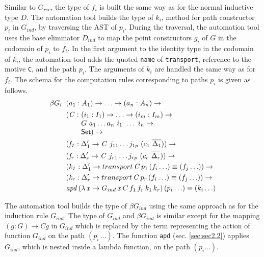\documentclass[sigplan,10pt]{acmart}
\begin{document}
Similar to $G_{rec}$, the type of $f_i$ is built the same way as for the normal inductive type $D$. The automation tool builds the type of $k_i$, method for path constructor $p_i$ in $G_{ind}$, by traversing the AST of $p_i$. During the traversal, the automation tool uses the base eliminator $D_{ind}$ to map the point constructors $g_i$ of $G$ in the codomain of $p_i$ to $f_i$. In the first argument to the identity type in the codomain of $k_i$, the automation tool adds the quoted {\tt name} of {\tt transport}, reference to the motive {\tt C}, and the path $p_i$. The arguments of $k_i$ are handled the same way as for $f_i$. The schema for the computation rules corresponding to paths $p_i$ is given as follows.
\begin{align*}
\beta G_i : & (a_1 : A_1) \to \ldots \to (a_n : A_n) \to\\
& \begin{array}{@{}l@{}l}(\mathit{C} :\ & (i_1 : I_1) \to \ldots \to (i_m : I_m) \to\\  & G\ a_1 \ldots a_n\ i_1\ \ldots\ i_n \to\\ &\SET{})\to\end{array} \\
& (\mathit{f_1} : \Delta_1^\prime \to \mathit{C}\ j_{11} \ldots j_{1p}\ (c_1\ \overline{\Delta_1})) \to \\
& (\mathit{f_r} : \Delta_r^\prime \to \mathit{C}\ j_{r1} \ldots j_{rp}\ (c_r\ \overline{\Delta_r})) \to \\
& (\mathit{k_1} : \Delta_1^\prime \to transport \, \mathit{C} \, p_1 \, (f_i \ldots) \equiv (f_j \ldots)) \to \\
& (\mathit{k_r} : \Delta_r^\prime \to transport \, \mathit{C} \, p_r \, (f_i \ldots) \equiv (f_j \ldots)) \to \\
& \mathit{apd} \, (\lambda \, x \to G_{ind} \, x \, C \, f_1 \, f_r \, k_1 \, k_r) \, (p_i \ldots) \equiv (k_i \ldots)
\end{align*}

The automation tool builds the type of $\beta G_{ind}$ using the same approach as for the induction rule $G_{ind}$. The type of $G_{ind}$ and $\beta G_{ind}$ is similar except for the mapping $(g : G) \to C g$ in $G_{ind}$ which is replaced by the term representing the action of function $G_{ind}$ on the path $(p_i \, \ldots)$. The function {\tt apd} (sec. \ref{sec:sec2.2}) applies $G_{ind}$, which is nested inside a lambda function, on the path $(p_i \ldots)$.
\end{document}
